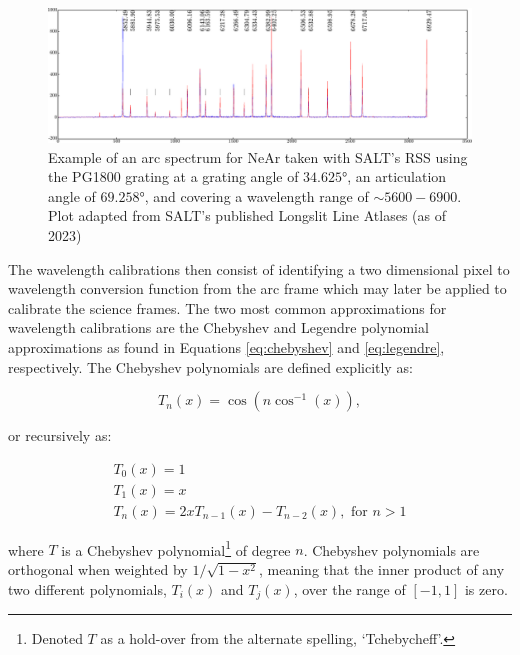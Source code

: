 \begin{figure}[t]
    \centering
    \includegraphics[width = 16cm]{figures/2_Ne_arc.pdf}
    \caption{Example of an arc spectrum for NeAr taken with \gls{SALT}'s \gls{RSS} using the PG1800 grating at a grating angle of $34.625$°, an articulation angle of $69.258$°, and covering a wavelength range of $\sim5600 - 6900$\angstrom. Plot adapted from \gls{SALT}'s published Longslit Line Atlases (as of 2023)\protect\footnotemark}
    \label{fig:Ne_arc}
\end{figure}

The wavelength calibrations then consist of identifying a two dimensional pixel to wavelength conversion function from the arc frame which may later be applied to calibrate the science frames. The two most common approximations for wavelength calibrations are the Chebyshev and Legendre polynomial approximations as found in Equations \ref{eq:chebyshev} and \ref{eq:legendre}, respectively. The Chebyshev polynomials are defined explicitly as:

\begin{equation}
    T_{n}(x) = \cos(n \cos^{-1}(x)),
    \label{eq:chebypolyexplicit}
\end{equation}

\noindent or recursively as:

\begin{gather}
    T_{0}(x) = 1 \nonumber \\
    T_{1}(x) = x \label{eq:chebypoly} \\
    T_{n}(x) = 2 x T_{n - 1}(x) - T_{n - 2}(x), \text{ for } n > 1 \nonumber
\end{gather}

\noindent where $T$ is a Chebyshev polynomial\footnote{Denoted $T$ as a hold-over from the alternate spelling, `Tchebycheff'.} of degree $n$. Chebyshev polynomials are orthogonal when weighted by $1 / \sqrt{1 - x^{2}}$, meaning that the inner product of any two different polynomials, $T_{i}(x)$ and $T_{j}(x)$, over the range of $[-1, 1]$ is zero.

